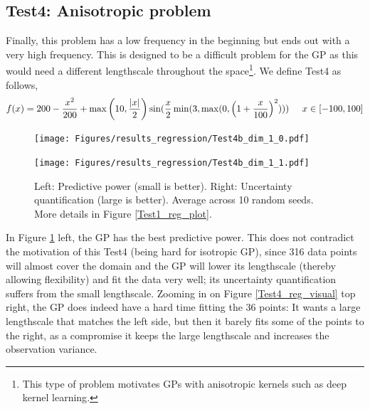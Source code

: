 \subsection{Test4: Anisotropic problem}
Finally, this problem has a low frequency in the beginning but ends out with a very high frequency.
This is designed to be a difficult problem for the GP as this would need a different lengthscale
throughout the space\footnote{This type of problem motivates GPs with anisotropic kernels such as deep
kernel learning\cite{DeepKernelLearning}.}. We define Test4 as follows, 
$$f(x) = 200 - \frac{x^2}{200} + \max\left(10, \frac{|x|}{2}\right) \sin(\frac{x}{2} \min(3, \max(0, \left(1 + \frac{x}{100}\right)^2))) \hspace{0.5cm} x \in [-100,100]$$

\begin{figure}[H]
  \centering
  \begin{minipage}[b]{0.49\textwidth}
   \texttt{[image: Figures/results\_regression/Test4b\_dim\_1\_0.pdf]}
  \end{minipage}
  \hfill
  \begin{minipage}[b]{0.49\textwidth}
    \texttt{[image: Figures/results\_regression/Test4b\_dim\_1\_1.pdf]}
   \end{minipage}
  \caption{Left: Predictive power (small is better). Right: Uncertainty quantification (large is
  better). Average across 10 random seeds. More details in Figure \ref{Test1_reg_plot}.}
  \label{Test4_reg_plot}
\end{figure}

In Figure \ref{Test4_reg_plot} left, the GP has the best predictive power. This does not contradict
the motivation of this Test4 (being hard for isotropic GP), since 316 data points will almost cover
the domain and the GP will lower its lengthscale (thereby allowing flexibility) and fit the data
very well; its uncertainty quantification suffers from the small lengthscale.
Zooming in on Figure \ref{Test4_reg_visual} top right, the GP does indeed have a hard time fitting
the 36 points: It wants a large lengthscale that matches the left side, but then it barely fits some
of the points to the right, as a compromise it keeps the large lengthscale and increases the observation
variance. 


